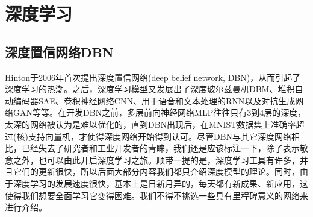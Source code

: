 
\chapter{深度学习}
\section{深度置信网络DBN}
    \par
    Hinton于2006年首次提出深度置信网络(deep belief network, DBN)，从而引起了深度学习的热潮。之后，深度学习模型又发展出了深度玻尔兹曼机DBM、堆积自动编码器SAE、卷积神经网络CNN、用于语音和文本处理的RNN以及对抗生成网络GAN等等。在开发DBN之前，多层前向神经网络MLP往往只有3到4层的深度，太深的网络被认为是难以优化的，直到DBN出现后，在MNIST数据集上准确率超过(核)支持向量机，才使得深度网络开始得到认可。尽管DBN与其它深度网络相比，已经失去了研究者和工业开发者的青睐，我们还是应该标注一下，除了表示敬意之外，也可以由此开启深度学习之旅。顺带一提的是，深度学习工具有许多，并且它们的更新很快，所以后面大部分内容我们都只介绍深度模型的理论。同时，由于深度学习的发展速度很快，基本上是日新月异的，每天都有新成果、新应用，这使得我们想要全面学习它变得困难。我们不得不挑选一些具有里程碑意义的网络来进行介绍。
